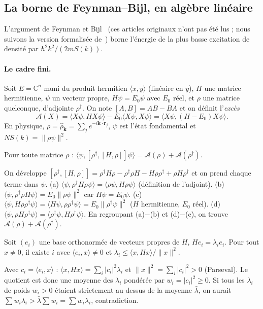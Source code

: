 \subsection{La borne de Feynman--Bijl, en algèbre linéaire}\label{ch3:sec:fb}
L'argument de Feynman et Bijl~\cite{ch3-feynman} (ces articles originaux n'ont pas été lus ; nous suivons la version
formalisée de~\cite{ch3-fb}) borne l'énergie de la plus basse excitation de densité par $\hbar^2k^2/(2mS(k))$.
\paragraph{Le cadre fini.} Soit $E=\mathbb{C}^n$ muni du produit hermitien $\langle x,y\rangle$ (linéaire en $y$), $H$
une matrice hermitienne, $\psi$ un vecteur propre, $H\psi=E_0\psi$ avec $E_0$ réel, et $\rho$ une matrice quelconque,
d'adjointe $\rho^\dagger$. On note $[A,B]=AB-BA$ et on définit l'\emph{excès}
\[
\mathcal A(X)=\langle X\psi,HX\psi\rangle-E_0\langle X\psi,X\psi\rangle=\langle X\psi,(H-E_0)X\psi\rangle .
\]
En physique, $\rho=\hat\rho_{\mathbf k}=\sum_je^{-i\mathbf k\cdot\mathbf r_j}$, $\psi$ est l'état fondamental et
$NS(k)=\|\rho\psi\|^2$.

\begin{lemma}\label{ch3:lem:dc}
Pour toute matrice $\rho$ : $\langle\psi,[\rho^\dagger,[H,\rho]]\psi\rangle=\mathcal A(\rho)+\mathcal A(\rho^\dagger)$. \tierAs
\end{lemma}
\begin{humanproof}
On développe $[\rho^\dagger,[H,\rho]]=\rho^\dagger H\rho-\rho^\dagger\rho H-H\rho\rho^\dagger+\rho H\rho^\dagger$ et on
prend chaque terme dans $\psi$.
(a) $\langle\psi,\rho^\dagger H\rho\psi\rangle=\langle\rho\psi,H\rho\psi\rangle$ (définition de l'adjoint).
(b) $\langle\psi,\rho^\dagger\rho H\psi\rangle=E_0\|\rho\psi\|^2$ car $H\psi=E_0\psi$.
(c) $\langle\psi,H\rho\rho^\dagger\psi\rangle=\langle H\psi,\rho\rho^\dagger\psi\rangle=E_0\|\rho^\dagger\psi\|^2$
($H$ hermitienne, $E_0$ réel).
(d) $\langle\psi,\rho H\rho^\dagger\psi\rangle=\langle\rho^\dagger\psi,H\rho^\dagger\psi\rangle$.
En regroupant (a)$-$(b) et (d)$-$(c), on trouve $\mathcal A(\rho)+\mathcal A(\rho^\dagger)$.
\end{humanproof}

\begin{lemma}\label{ch3:lem:rayleigh}
Soit $(e_i)$ une base orthonormée de vecteurs propres de $H$, $He_i=\lambda_ie_i$. Pour tout $x\ne0$, il existe $i$ avec
$\langle e_i,x\rangle\neq0$ et $\lambda_i\le\langle x,Hx\rangle/\|x\|^2$. \tierAs
\end{lemma}
\begin{humanproof}
Avec $c_i=\langle e_i,x\rangle$ : $\langle x,Hx\rangle=\sum_i|c_i|^2\lambda_i$ et $\|x\|^2=\sum_i|c_i|^2>0$ (Parseval). Le
quotient est donc une moyenne des $\lambda_i$ pondérée par $w_i=|c_i|^2\ge0$. Si tous les $\lambda_i$ de poids $w_i>0$
étaient strictement au-dessus de la moyenne $\bar\lambda$, on aurait $\sum w_i\lambda_i>\bar\lambda\sum w_i=\sum
w_i\lambda_i$, contradiction.
\end{humanproof}


